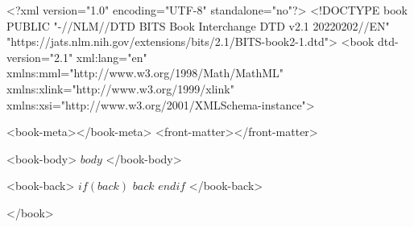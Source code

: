 <?xml version="1.0" encoding="UTF-8" standalone="no"?>
<!DOCTYPE book PUBLIC "-//NLM//DTD BITS Book Interchange DTD v2.1 20220202//EN" "https://jats.nlm.nih.gov/extensions/bits/2.1/BITS-book2-1.dtd">
<book
dtd-version="2.1" xml:lang="en" 
xmlns:mml="http://www.w3.org/1998/Math/MathML" 
xmlns:xlink="http://www.w3.org/1999/xlink" 
xmlns:xsi="http://www.w3.org/2001/XMLSchema-instance">

<book-meta></book-meta>
<front-matter></front-matter>

<book-body>
$body$
</book-body>

<book-back>
$if(back)$
$back$
$endif$
</book-back>

</book>
